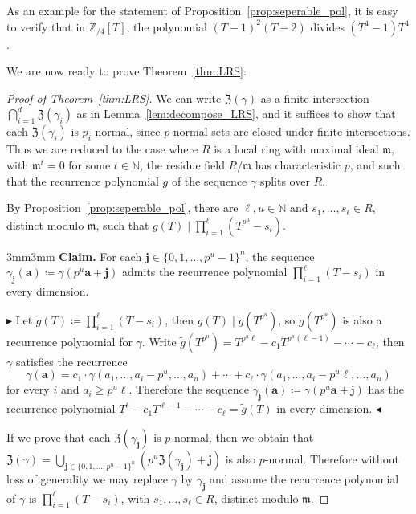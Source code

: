 \documentclass[letterpaper, 11pt, thm-restate]{article}
\numberwithin{equation}{section}
\newcommand{\Z}{\mathbb{Z}}
\newcommand{\N}{\mathbb{N}}
\newcommand{\mZ}{\mathfrak{Z}}
\newcommand{\ba}{\boldsymbol{a}}
\newcommand{\bj}{\boldsymbol{j}}
\newcommand{\frm}{\mathfrak{m}}
\theoremstyle{definition}
\theoremstyle{definition}
\theoremstyle{definition}
\begin{document}
As an example for the statement of Proposition~\ref{prop:seperable_pol}, it is easy to verify that in $\Z_{/4}[T]$, the polynomial $(T-1)^2(T-2)$ divides $(T^4-1)T^4$.
\medskip

We are now ready to prove Theorem~\ref{thm:LRS}:
\begin{proof}[Proof of Theorem~\ref{thm:LRS}]
We can write $\mZ(\gamma)$ as a finite intersection $\bigcap_{i = 1}^d \mZ(\gamma_i)$ as in Lemma~\ref{lem:decompose_LRS}, and it suffices to show that each $\mZ(\gamma_i)$ is $p_i$-normal, since $p$-normal sets are closed under finite intersections.
Thus we are reduced to the case where $R$ is a local ring with maximal ideal $\frm$, with $\frm^t = 0$ for some $t \in \N$, the residue field $R/\frm$ has characteristic $p$, and such that the recurrence polynomial $g$ of the sequence $\gamma$ splits over $R$.

By Proposition~\ref{prop:seperable_pol}, there are $\ell, u \in \N$ and $s_1,\ldots,s_{\ell} \in R$, distinct modulo $\frm$, such that $g(T)\mid \prod_{i=1}^{\ell} (T^{p^u}-s_i)$.

    \medskip
    \begin{adjustwidth}{3mm}{3mm}
    \textbf{Claim.} For each $\bj \in \{0, 1, \ldots, p^u-1\}^n$, the sequence $\gamma_{\bj}(\ba) \coloneqq \gamma(p^u \ba + \bj)$ admits the recurrence polynomial $\prod_{i=1}^{\ell} (T-s_i)$ in every dimension.
    \medskip
    
    \noindent$\blacktriangleright$
    Let $\tilde g(T) \coloneqq \prod_{i=1}^{\ell} (T-s_i)$, then $g(T) \mid \tilde g(T^{p^u})$, so $\tilde g(T^{p^u})$ is also a recurrence polynomial for $\gamma$.
    Write $\tilde g(T^{p^u}) = T^{p^u \ell} - c_1 T^{p^u(\ell - 1)} - \cdots - c_{\ell}$, then $\gamma$ satisfies the recurrence 
    \[
    \gamma(\ba) = c_1 \cdot \gamma(a_1, \ldots, a_i-p^u, \ldots, a_n) + \cdots + c_{\ell} \cdot \gamma(a_1, \ldots, a_i-p^u\ell, \ldots, a_n)
    \]
    for every $i$ and $a_i \geq p^u \ell$.
    Therefore the sequence $\gamma_{\bj}(\ba) \coloneqq \gamma(p^u \ba + \bj)$ has the recurrence polynomial $T^{\ell} - c_1 T^{\ell - 1} - \cdots - c_{\ell} = \tilde g(T)$ in every dimension.
    \hfill $\blacktriangleleft$
    \end{adjustwidth}
    \medskip
If we prove that each $\mZ(\gamma_{\bj})$ is $p$-normal, then we obtain that $\mZ(\gamma) = \bigcup_{\bj \in \{0, 1, \ldots, p^u-1\}^n} \left(p^u \mZ(\gamma_{\bj}) + \bj \right)$ is also $p$-normal.
Therefore without loss of generality we may replace $\gamma$ by $\gamma_{\bj}$ and assume the recurrence polynomial of $\gamma$ is $\prod_{i=1}^{\ell} (T-s_i)$, with $s_1, \ldots, s_{\ell} \in R$, distinct modulo $\frm$.


\end{proof}
\end{document}
